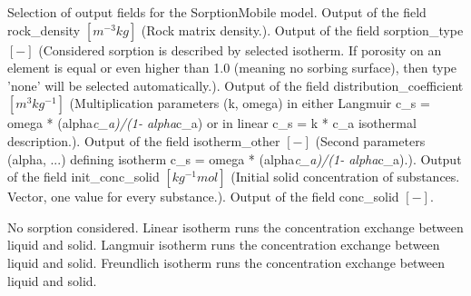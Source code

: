 \begin{SelectionType}
	{}
	{{{Selection of output fields for the SorptionMobile model.}}}
		\KeyItem
			{}
			{{{Output of the field rock{\_}density }{$[m^{-3}kg]$}{ (Rock matrix density.).}}}
		\KeyItem
			{}
			{{{Output of the field sorption{\_}type }{$[-]$}{ (Considered sorption is described by selected isotherm. If porosity on an element is equal or even higher than 1.0 (meaning no sorbing surface), then type 'none' will be selected automatically.).}}}
		\KeyItem
			{}
			{{{Output of the field distribution{\_}coefficient }{$[m^{3}kg^{-1}]$}{ (Multiplication parameters (k, omega) in either Langmuir c{\_}s = omega * (alpha}\textit{c{\_}a)/(1- alpha}{c{\_}a) or in linear c{\_}s = k * c{\_}a isothermal description.).}}}
		\KeyItem
			{}
			{{{Output of the field isotherm{\_}other }{$[-]$}{ (Second parameters (alpha, ...) defining isotherm  c{\_}s = omega * (alpha}\textit{c{\_}a)/(1- alpha}{c{\_}a).).}}}
		\KeyItem
			{}
			{{{Output of the field init{\_}conc{\_}solid }{$[kg^{-1}mol]$}{ (Initial solid concentration of substances. Vector, one value for every substance.).}}}
		\KeyItem
			{}
			{{{Output of the field conc{\_}solid }{$[-]$}{.}}}
\end{SelectionType}
\begin{SelectionType}
	{}
	{}
		\KeyItem
			{}
			{{{No sorption considered.}}}
		\KeyItem
			{}
			{{{Linear isotherm runs the concentration exchange between liquid and solid.}}}
		\KeyItem
			{}
			{{{Langmuir isotherm runs the concentration exchange between liquid and solid.}}}
		\KeyItem
			{}
			{{{Freundlich isotherm runs the concentration exchange between liquid and solid.}}}
\end{SelectionType}
